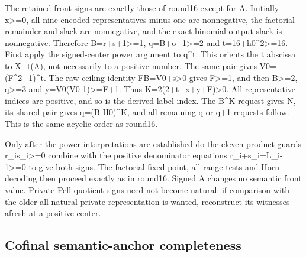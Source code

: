 The retained front signs are exactly those of round16 except for A. Initially x\textgreater{}\allowbreak{}=\allowbreak{}0, all nine encoded representatives minus one are nonnegative, the factorial remainder and slack are nonnegative, and the exact-binomial output slack is nonnegative. Therefore B=\allowbreak{}r+\allowbreak{}s+\allowbreak{}1\textgreater{}\allowbreak{}=\allowbreak{}1, q=\allowbreak{}B+\allowbreak{}o+\allowbreak{}1\textgreater{}\allowbreak{}=\allowbreak{}2 and t=\allowbreak{}16+\allowbreak{}h0\textasciicircum{}\allowbreak{}2\textgreater{}\allowbreak{}=\allowbreak{}16. First apply the signed-center power argument to q\textasciicircum{}\allowbreak{}t. This orients the t abscissa to X\_\allowbreak{}t(A), not necessarily to a positive number. The same pair gives V0=\allowbreak{}(F\textasciicircum{}\allowbreak{}2+\allowbreak{}1)\textasciicircum{}\allowbreak{}t. The raw ceiling identity FB=\allowbreak{}V0+\allowbreak{}s\textgreater{}\allowbreak{}0 gives F\textgreater{}\allowbreak{}=\allowbreak{}1, and then B\textgreater{}\allowbreak{}=\allowbreak{}2, q\textgreater{}\allowbreak{}=\allowbreak{}3 and y=\allowbreak{}V0(V0-1)\textgreater{}\allowbreak{}=\allowbreak{}F+\allowbreak{}1. Thus K=\allowbreak{}2(2+\allowbreak{}t+\allowbreak{}x+\allowbreak{}y+\allowbreak{}F)\textgreater{}\allowbreak{}0. All representative indices are positive, and so is the derived-label index. The B\textasciicircum{}\allowbreak{}K request gives N, its shared pair gives q=\allowbreak{}(B H0)\textasciicircum{}\allowbreak{}K, and all remaining q or q+\allowbreak{}1 requests follow. This is the same acyclic order as round16.



Only after the power interpretations are established do the eleven product guards r\_\allowbreak{}i\textasteriskcentered{}\allowbreak{}s\_\allowbreak{}i\textgreater{}\allowbreak{}=\allowbreak{}0 combine with the positive denominator equations r\_\allowbreak{}i+\allowbreak{}s\_\allowbreak{}i=\allowbreak{}L\_\allowbreak{}i-1\textgreater{}\allowbreak{}=\allowbreak{}0 to give both signs. The factorial fixed point, all range tests and Horn decoding then proceed exactly as in round16. Signed A changes no semantic front value. Private Pell quotient signs need not become natural: if comparison with the older all-natural private representation is wanted, reconstruct its witnesses afresh at a positive center.



\subsection{Cofinal semantic-anchor completeness}



